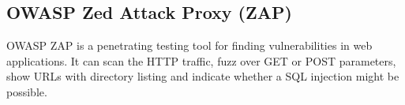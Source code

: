 \subsection{OWASP Zed Attack Proxy (ZAP)}
OWASP ZAP is a penetrating testing tool for finding vulnerabilities in web applications. It can scan the HTTP traffic, fuzz over GET or POST parameters, show URLs with directory listing and indicate whether a SQL injection might be possible.
